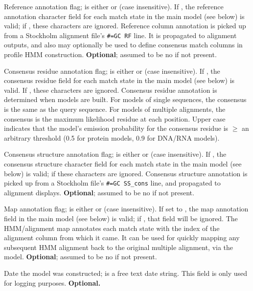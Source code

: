 \begin{sreitems}{}
\item [\emprog{RF <s>}] Reference annotation flag;  is
either  or  (case insensitive). If , the
reference annotation character field for each match state in the main
model (see below) is valid; if , these characters are
ignored.  Reference column annotation is picked up from a Stockholm
alignment file's \verb+#=GC RF+ line. It is propagated to alignment
outputs, and also may optionally be used to define consensus match
columns in profile HMM construction. \textbf{Optional}; assumed to be
no if not present.

\item [\emprog{CONS <s>}] Consensus residue annotation flag;
   is either  or  (case insensitive).  If
  , the consensus residue field for each match state in the
  main model (see below) is valid. If , these characters are
  ignored. Consensus residue annotation is determined when models are
  built. For models of single sequences, the consensus is the same as
  the query sequence. For models of multiple alignments, the consensus
  is the maximum likelihood residue at each position. Upper case
  indicates that the model's emission probability for the consensus
  residue is $\geq$ an arbitrary threshold (0.5 for protein models,
  0.9 for DNA/RNA models).

\item [\emprog{CS <s>}] Consensus structure annotation flag;
 is either  or  (case insensitive). If
, the consensus structure character field for each match
state in the main model (see below) is valid; if  these
characters are ignored. Consensus structure annotation is picked up
from a Stockholm file's \verb+#=GC SS_cons+ line, and propagated to
alignment displays.  \textbf{Optional}; assumed to be no if not
present.

\item [\emprog{MAP <s>}] Map annotation flag;  is either
 or  (case insensitive).  If set to , the
map annotation field in the main model (see below) is valid; if
, that field will be ignored.  The HMM/alignment map
annotates each match state with the index of the alignment column from
which it came. It can be used for quickly mapping any subsequent
HMM alignment back to the original multiple alignment, via the model.
\textbf{Optional}; assumed to be no if not present.

\item [\emprog{DATE <s>}] Date the model was constructed; 
is a free text date string.  This field is only used for logging
purposes. \textbf{Optional.}


\end{sreitems}
